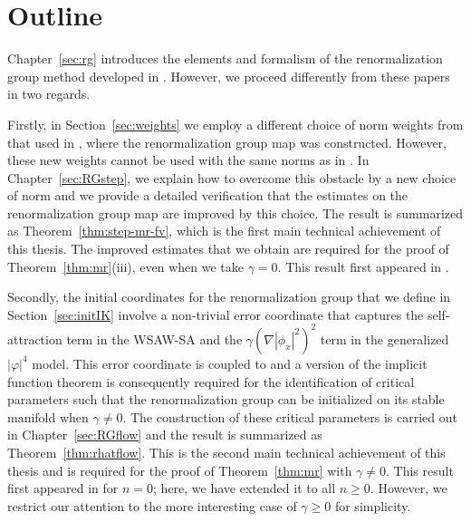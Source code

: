 
\section{Outline}
\label{sec:outline}

Chapter~\ref{sec:rg} introduces the elements and formalism of the renormalization
group method developed in \cite{BS-rg-norm,BS-rg-loc,BBS-rg-pt,BS-rg-IE,BS-rg-step}.
However, we proceed differently from these papers in two regards.

Firstly, in Section~\ref{sec:weights} we employ a different choice of norm weights
from that used in \cite{BS-rg-step}, where the renormalization group map was constructed.
However, these new weights cannot be used with the same norms as in \cite{BS-rg-step}.
In Chapter~\ref{sec:RGstep}, we explain how to overcome this obstacle by a new choice
of norm and we provide a detailed verification that the estimates on the renormalization
group map are improved by this choice. The result is summarized as Theorem~\ref{thm:step-mr-fv},
which is the first main technical achievement of this thesis. The improved estimates
that we obtain are required for the proof of Theorem~\ref{thm:mr}(iii), even when we
take $\gamma = 0$. This result first appeared in \cite{BSTW-clp}.

Secondly, the initial coordinates for the renormalization group that we define in
Section~\ref{sec:initIK} involve a non-trivial error coordinate that captures
the self-attraction term in the WSAW-SA and the $\gamma (\nabla |\phi_x|^2)^2$
term in the generalized $|\varphi|^4$ model. This error coordinate is coupled to
and a version of the implicit function
theorem is consequently required for the identification of critical parameters
such that the renormalization group can be initialized on its stable manifold when
$\gamma \ne 0$. The construction of these critical parameters is carried out in
Chapter~\ref{sec:RGflow} and the result is summarized as Theorem~\ref{thm:rhatflow}.
This is the second main technical achievement of this thesis and is required for the
proof of Theorem~\ref{thm:mr} with $\gamma \ne 0$. This result first appeared in
\cite{BSW-saw-sa} for $n = 0$; here, we have extended it to all $n \ge 0$. However,
we restrict our attention to the more interesting case of $\gamma \ge 0$ for
simplicity.


